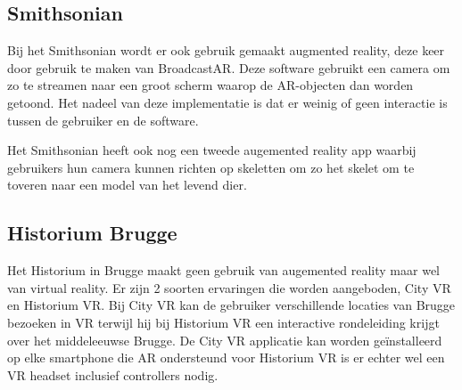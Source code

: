 \subsection{Smithsonian}
Bij het Smithsonian wordt er ook gebruik gemaakt augmented reality, deze keer door gebruik te maken van BroadcastAR. Deze software gebruikt een camera om zo te streamen naar een groot scherm waarop de AR-objecten dan worden getoond. Het nadeel van deze implementatie is dat er weinig of geen interactie is tussen de gebruiker en de software. 

Het Smithsonian heeft ook nog een tweede augemented reality app waarbij gebruikers hun camera kunnen richten op skeletten om zo het skelet om te toveren naar een model van het levend dier.

\subsection{Historium Brugge}
Het Historium in Brugge maakt geen gebruik van augemented reality maar wel van virtual reality. Er zijn 2 soorten ervaringen die worden aangeboden, City VR en Historium VR. Bij City VR kan de gebruiker verschillende locaties van Brugge bezoeken in VR terwijl hij bij Historium VR een interactive rondeleiding krijgt over het middeleeuwse Brugge. De City VR applicatie kan worden geïnstalleerd op elke smartphone die AR ondersteund voor Historium VR is er echter wel een VR headset inclusief controllers nodig. 

